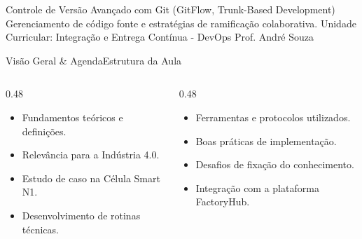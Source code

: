 
\senaicover
  {Controle de Versão Avançado com Git (GitFlow, Trunk-Based Development)}
  {Gerenciamento de código fonte e estratégias de ramificação colaborativa.}
  {Unidade Curricular: Integração e Entrega Contínua - DevOps}
  {Prof. André Souza}

\begin{senaiframe}{Visão Geral \& Agenda}{Estrutura da Aula}
  \begin{columns}[t]
    \begin{column}{0.48\textwidth}
      \begin{tcolorbox}[senaibluecard, title={1. Conceitos Chave}]
        \begin{itemize}
          \item Fundamentos teóricos e definições.
          \item Relevância para a Indústria 4.0.
        \end{itemize}
      \end{tcolorbox}
      \vspace{4pt}
      \begin{tcolorbox}[senaiambercard, title={3. Aplicação Prática}]
        \begin{itemize}
          \item Estudo de caso na Célula Smart N1.
          \item Desenvolvimento de rotinas técnicas.
        \end{itemize}
      \end{tcolorbox}
    \end{column}
    \begin{column}{0.48\textwidth}
      \begin{tcolorbox}[senairedcard, title={2. Detalhamento Técnico}]
        \begin{itemize}
          \item Ferramentas e protocolos utilizados.
          \item Boas práticas de implementação.
        \end{itemize}
      \end{tcolorbox}
      \vspace{4pt}
      \begin{tcolorbox}[senaigreencard, title={4. Exercícios \& Avaliação}]
        \begin{itemize}
          \item Desafios de fixação do conhecimento.
          \item Integração com a plataforma FactoryHub.
        \end{itemize}
      \end{tcolorbox}
    \end{column}
  \end{columns}
\end{senaiframe}

